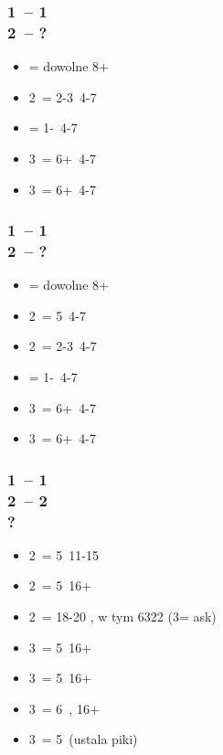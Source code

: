 \documentclass[12pt, a4paper]{article}
\begin{document}
\subsubsection*{1\hearts\ -- 1\ntx\ \\ 2\clubs\ -- ?}
\begin{itemize}
    \item \alrts{2\diams} = dowolne 8+ \imp
    \item 2\hearts\ = 2-3\hearts\ 4-7
    \item \alrts{2\nt} = 1-\hearts\ 4-7
    \item 3\clubs\ = 6+\clubs\ 4-7
    \item 3\diams\ = 6+\diams\ 4-7
\end{itemize}

\subsubsection*{1\spades\ -- 1\ntx\ \\ 2\clubs\ -- ?}
\begin{itemize}
    \item \alrts{2\diams} = dowolne 8+ \imp
    \item 2\hearts\ = 5\hearts\ 4-7
    \item 2\spades\ = 2-3\spades\ 4-7
    \item \alrts{2\ntx} = 1-\spades\ 4-7
    \item 3\clubs\ = 6+\clubs\ 4-7
    \item 3\diams\ = 6+\diams\ 4-7
\end{itemize}

\subsubsection*{1\hearts\ -- 1\spades\ \\ 2\clubs\ -- 2\diams \\ ?}
\begin{itemize}
    \item 2\hearts\ = 5\clubs\ 11-15
    \item 2\spades\ = 5\spades\ 16+
    \item 2\ntx\ = 18-20 \bal, w tym 6322 (3\clubs = ask)
    \item 3\clubs\ = 5\clubs\ 16+
    \item 3\diams\ = 5\diams\ 16+
    \item 3\hearts\ = 6\hearts\ \unbal, 16+
    \item 3\spades\ = 5\spades\ \gf (ustala piki)
\end{itemize}
\end{document}
